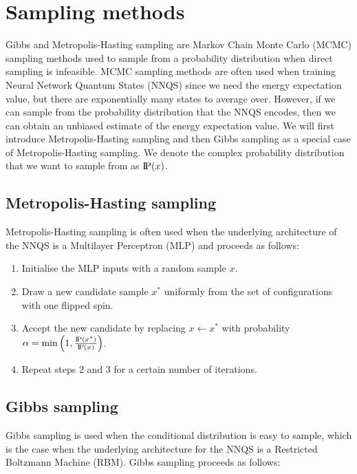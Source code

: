 \section{Sampling methods}\label{samplingmethods}
Gibbs and Metropolis-Hasting sampling are Markov Chain Monte Carlo (MCMC) sampling methods used to sample from a probability distribution when direct sampling is infeasible. MCMC sampling methods are often used when training Neural Network Quantum States (NNQS) since we need the energy expectation value, but there are exponentially many states to average over. However, if we can sample from the probability distribution that the NNQS encodes, then we can obtain an unbiased estimate of the energy expectation value. We will first introduce Metropolis-Hasting sampling and then Gibbs sampling as a special case of Metropolis-Hasting sampling. We denote the complex probability distribution that we want to sample from as $\text{I\kern-0.15em P}(x)$.

\subsection*{Metropolis-Hasting sampling}
Metropolis-Hasting sampling \cite{metropolissampling} is often used when the underlying architecture of the NNQS is a Multilayer Perceptron (MLP) and proceeds as follows:
\begin{enumerate}
    \item Initialise the MLP inputs with a random sample $x$.
    \item Draw a new candidate sample $x^*$ uniformly from the set of configurations with one flipped spin.
    \item Accept the new candidate by replacing $x \leftarrow x^*$ with probability $\alpha = \min \left(1, \frac{\text{I\kern-0.15em P}(x^*)}{\text{I\kern-0.15em P}(x)}\right)$.
    \item Repeat steps 2 and 3 for a certain number of iterations.
\end{enumerate}

\subsection*{Gibbs sampling}
Gibbs sampling \cite{gibbssampling} is used when the conditional distribution is easy to sample, which is the case when the underlying architecture for the NNQS is a Restricted Boltzmann Machine (RBM). Gibbs sampling proceeds as follows:

